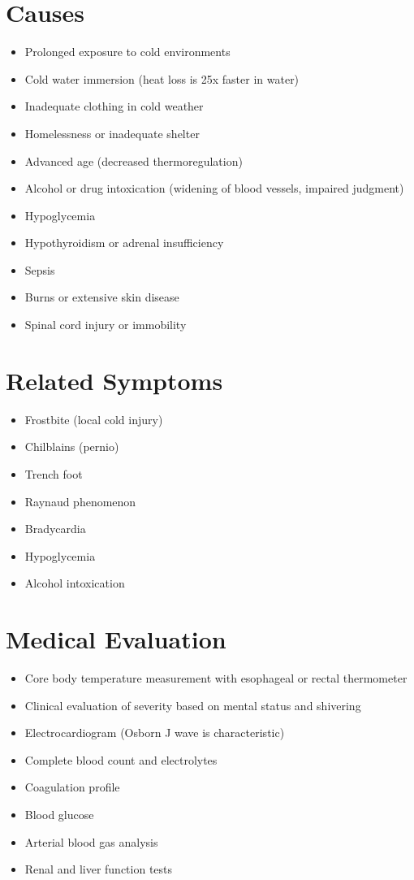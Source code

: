 \section*{Causes}
\begin{itemize}
\item Prolonged exposure to cold environments
\item Cold water immersion (heat loss is 25x faster in water)
\item Inadequate clothing in cold weather
\item Homelessness or inadequate shelter
\item Advanced age (decreased thermoregulation)
\item Alcohol or drug intoxication (widening of blood vessels, impaired judgment)
\item Hypoglycemia
\item Hypothyroidism or adrenal insufficiency
\item Sepsis
\item Burns or extensive skin disease
\item Spinal cord injury or immobility
\end{itemize}

\section*{Related Symptoms}
\begin{itemize}
\item Frostbite (local cold injury)
\item Chilblains (pernio)
\item Trench foot
\item Raynaud phenomenon
\item Bradycardia
\item Hypoglycemia
\item Alcohol intoxication
\end{itemize}

\section*{Medical Evaluation}
\begin{itemize}
\item Core body temperature measurement with esophageal or rectal thermometer
\item Clinical evaluation of severity based on mental status and shivering
\item Electrocardiogram (Osborn J wave is characteristic)
\item Complete blood count and electrolytes
\item Coagulation profile
\item Blood glucose
\item Arterial blood gas analysis
\item Renal and liver function tests
\end{itemize}

